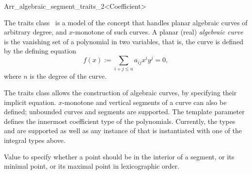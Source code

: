 
\ccRefPageBegin
\begin{ccRefClass}{Arr_algebraic_segment_traits_2<Coefficient>}

\ccDefinition

The traits class \ccRefName\ is a model of the 
concept that handles planar algebraic curves of arbitrary degree, 
and $x$-monotone of such curves.
A planar (real) \emph{algebraic curve} 
is the vanishing set of a polynomial in two variables, that is, the
curve is defined by the defining equation
$$f(x):=\sum_{i+j\leq n} a_{ij} x^i y^j =0,$$
where $n$ is the degree of the curve.

The traits class allows the construction of algebraic curves,
by specifying their implicit equation. $x$-monotone and vertical segments 
of a curve can also be defined; unbounded curves and segments are supported. 
The template parameter  defines
the innermost coefficient type of the polynomials. Currently, 
the types  and  are supported as well
as any instance of  that is instantiated with
one of the integral types above.


\ccIsModel

\ccTypes

        {Value to specify whether a point should be in the interior
         of a segment, or its minimal point, 
         or its maximal point in lexicographic order.}





\end{ccRefClass}
